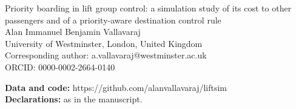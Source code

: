 \documentclass[12pt]{article}
\begin{document}
\begin{center}
{\Large Priority boarding in lift group control: a simulation study of its cost to other passengers and of a priority-aware destination control rule}\\[2em]
Alan Immanuel Benjamin Vallavaraj\\[.5em]
University of Westminster, London, United Kingdom\\[.5em]
Corresponding author: a.vallavaraj@westminster.ac.uk\\
ORCID: 0000-0002-2664-0140
\end{center}
\vspace{2em}
\noindent\textbf{Data and code:} https://github.com/alanvallavaraj/liftsim\\[1em]
\noindent\textbf{Declarations:} as in the manuscript.
\end{document}
